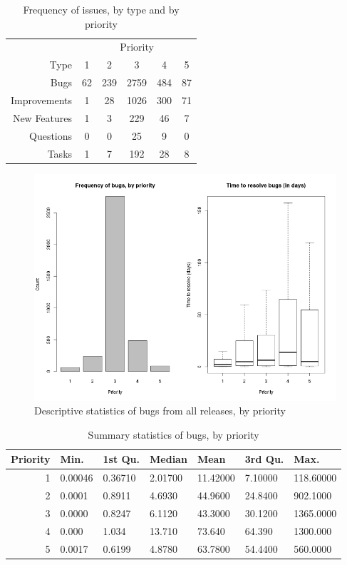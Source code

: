 \documentclass[a4paper]{scrartcl}
\begin{document}
\begin{table}[h!]
\caption{Frequency of issues, by type and by priority}
\centering
\begin{tabular}{ r | c | c | c | c |  c | }
\hline
~ & \multicolumn{5}{|c|}{Priority} \\
Type & 1 & 2 & 3 & 4 & 5 \\
\hline\hline
Bugs & 62 & 239 & 2759 & 484 & 87 \\
Improvements & 1 & 28 & 1026 & 300 & 71 \\
New Features & 1 & 3 & 229 & 46 & 7 \\
Questions & 0 & 0 & 25 & 9 & 0 \\
Tasks & 1 & 7 & 192 & 28 & 8 \\
\hline
\end{tabular}
\label{tab:all_freqcount}
\end{table}


\begin{figure}
\begin{center}
\includegraphics[width=6in]{exploratory_results/mongodb_allreleases/bugs}
\caption{Descriptive statistics of bugs from all releases, by priority}
\label{fig:all_bugs}
\end{center}
\end{figure}

\begin{table}[h!]
\caption{Summary statistics of bugs, by priority}
\centering
\begin{tabular}{ r | l | l | l | l |  l | l }
\hline
Priority & Min. & 1st Qu. & Median & Mean & 3rd Qu. & Max. \\
\hline\hline
1 & 0.00046 & 0.36710 & 2.01700 & 11.42000 & 7.10000 & 118.60000 \\
2 & 0.0001 & 0.8911 & 4.6930 & 44.9600 & 24.8400 & 902.1000 \\
3 & 0.0000 & 0.8247 & 6.1120 & 43.3000 & 30.1200 & 1365.0000 \\
4 & 0.000 & 1.034 & 13.710 & 73.640 & 64.390 & 1300.000 \\
5 & 0.0017 & 0.6199 & 4.8780 & 63.7800 & 54.4400 & 560.0000 \\
\hline
\end{tabular}
\label{tab:all_bugs_summary}
\end{table}
\end{document}

